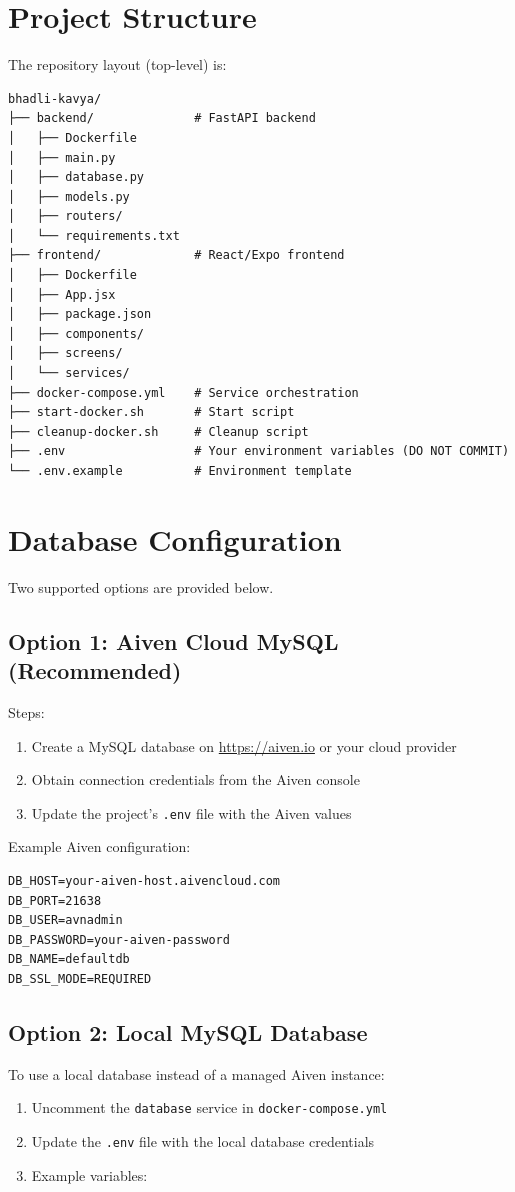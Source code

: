 \documentclass[11pt]{article}
\begin{document}
\section{Project Structure}
The repository layout (top-level) is:
\begin{Verbatim}[fontsize=\small]
bhadli-kavya/
├── backend/              # FastAPI backend
│   ├── Dockerfile
│   ├── main.py
│   ├── database.py
│   ├── models.py
│   ├── routers/
│   └── requirements.txt
├── frontend/             # React/Expo frontend
│   ├── Dockerfile
│   ├── App.jsx
│   ├── package.json
│   ├── components/
│   ├── screens/
│   └── services/
├── docker-compose.yml    # Service orchestration
├── start-docker.sh       # Start script
├── cleanup-docker.sh     # Cleanup script
├── .env                  # Your environment variables (DO NOT COMMIT)
└── .env.example          # Environment template
\end{Verbatim}

\section{Database Configuration}
Two supported options are provided below.

\subsection{Option 1: Aiven Cloud MySQL (Recommended)}
Steps:
\begin{enumerate}
	\item Create a MySQL database on \url{https://aiven.io} or your cloud provider
	\item Obtain connection credentials from the Aiven console
	\item Update the project's \texttt{.env} file with the Aiven values
\end{enumerate}

Example Aiven configuration:
\begin{Verbatim}[fontsize=\small]
DB_HOST=your-aiven-host.aivencloud.com
DB_PORT=21638
DB_USER=avnadmin
DB_PASSWORD=your-aiven-password
DB_NAME=defaultdb
DB_SSL_MODE=REQUIRED
\end{Verbatim}

\subsection{Option 2: Local MySQL Database}
To use a local database instead of a managed Aiven instance:
\begin{enumerate}
	\item Uncomment the \texttt{database} service in \texttt{docker-compose.yml}
	\item Update the \texttt{.env} file with the local database credentials
	\item Example variables:
\end{enumerate}
\end{document}
